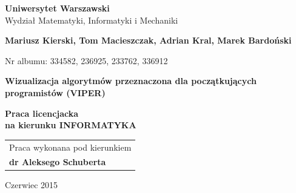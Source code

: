 \documentclass[a4paper,twoside,openright,11pt]{report}
\begin{document}
\begin{titlepage}%
    \let\footnotesize\small
    \let\footnoterule\relax
    \let \footnote \thanks
    \begin{center}%
      {\LARGE\textbf{Uniwersytet Warszawski}\\
        Wydzia\l{} Matematyki, Informatyki i Mechaniki\par}
      \vspace{1cm plus 1fill} 
      {\Large\bf Mariusz Kierski, Tom Macieszczak, Adrian Kral, Marek Bardoński\par}
      \vspace{0.2cm}
      {\large Nr albumu: 334582, 236925, 233762, 336912\par}
      \vspace{8mm plus .1fill}
      {\Huge\textbf{Wizualizacja algorytmów przeznaczona dla początkujących programistów (VIPER)}\par}
      \vspace{8mm plus .1fill}
      {\large\bf Praca licencjacka\\[3pt]
        na kierunku \MakeUppercase{Informatyka} \\}
      \vspace{2cm plus 1.5fill}
      \begin{flushright}\large
        \begin{tabular}{l}
          Praca wykonana pod kierunkiem\\
          \bfseries dr Aleksego Schuberta
        \end{tabular}
      \end{flushright}
      \vspace{1cm plus 1fill}
      {\large Czerwiec 2015}
    \end{center}
  \end{titlepage}%
\end{document}
